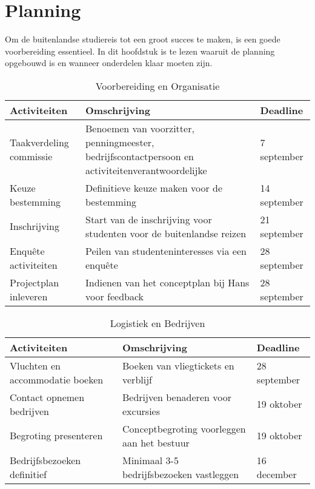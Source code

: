 \section{Planning}

Om de buitenlandse studiereis tot een groot succes te maken, is een goede voorbereiding essentieel. In dit hoofdstuk is te lezen waaruit de planning opgebouwd is en wanneer onderdelen klaar moeten zijn.

\vspace{7cm}

\begin{table}[h!]
	\centering
	\caption{Voorbereiding en Organisatie}
	\label{tab:voorbereiding}
	\begin{tabular}{|p{4cm}|p{6cm}|p{5cm}|}
		\hline
		\textbf{Activiteiten} & \textbf{Omschrijving} & \textbf{Deadline} \\
		\hline
		Taakverdeling commissie & Benoemen van voorzitter, penningmeester, bedrijfscontactpersoon en activiteitenverantwoordelijke & 7 september \\
		\hline
		Keuze bestemming & Definitieve keuze maken voor de bestemming & 14 september \\
		\hline
		Inschrijving & Start van de inschrijving voor studenten voor de buitenlandse reizen & 21 september \\
		\hline
		Enquête activiteiten & Peilen van studenteninteresses via een enquête & 28 september \\
		\hline
		Projectplan inleveren & Indienen van het conceptplan bij Hans voor feedback & 28 september \\
		\hline
	\end{tabular}
\end{table}

\begin{table}[h!]
	\centering
	\caption{Logistiek en Bedrijven}
	\label{tab:logistiek}
	\begin{tabular}{|p{4cm}|p{6cm}|p{5cm}|}
		\hline
		\textbf{Activiteiten} & \textbf{Omschrijving} & \textbf{Deadline} \\
		\hline
		Vluchten en accommodatie boeken & Boeken van vliegtickets en verblijf & 28 september \\
		\hline
		Contact opnemen bedrijven & Bedrijven benaderen voor excursies & 19 oktober \\
		\hline
		Begroting presenteren & Conceptbegroting voorleggen aan het bestuur & 19 oktober \\
		\hline
		Bedrijfsbezoeken definitief & Minimaal 3-5 bedrijfsbezoeken vastleggen & 16 december \\
		\hline
	\end{tabular}
\end{table}

